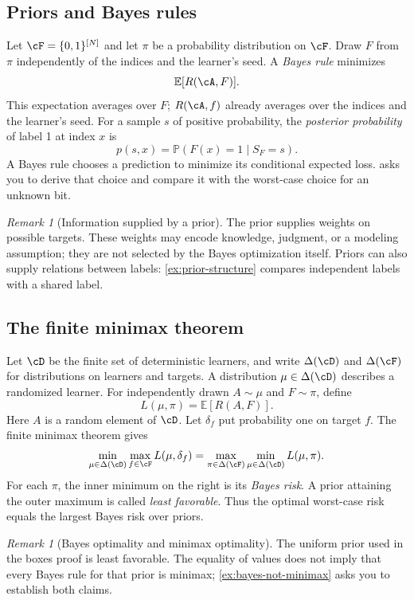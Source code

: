 \documentclass[11pt,twoside]{article}
\renewcommand{\P}{\mathbb P}
\theoremstyle{definition}
\theoremstyle{remark}
\newtheorem{remark}[theorem]{Remark}
\begin{document}
\subsection{Priors and Bayes rules}
Let $\cF=\{0,1\}^{[N]}$ and let $\pi$ be a probability distribution on
$\cF$. Draw $F$ from $\pi$ independently of the indices and the learner's
seed. A \emph{Bayes rule} minimizes
\begin{equation}
\mathbb E[R(\cA,F)].
\label{eq:bayes-risk}
\end{equation}
This expectation averages over $F$; $R(\cA,f)$ already averages over the
indices and the learner's seed. For a sample $s$ of positive probability,
the \emph{posterior probability} of label 1 at index $x$ is
\[
p(s,x)=\P(F(x)=1\mid S_F=s).
\]
A Bayes rule chooses a prediction to minimize its conditional expected loss.
 asks you to derive that choice and compare it
with the worst-case choice for an unknown bit.

\begin{remark}[Information supplied by a prior]
\label{rem:prior-information}
The prior supplies weights on possible targets. These weights may encode
knowledge, judgment, or a modeling assumption; they are not selected by the
Bayes optimization itself. Priors can also supply relations between labels:
\cref{ex:prior-structure} compares independent labels with a shared label.
\end{remark}

\subsection{The finite minimax theorem}
Let $\cD$ be the finite set of deterministic learners, and write
$\Delta(\cD)$ and $\Delta(\cF)$ for distributions on learners and targets.
A distribution $\mu\in\Delta(\cD)$ describes a randomized learner.
For independently drawn $A\sim\mu$ and $F\sim\pi$, define
\begin{equation}
L(\mu,\pi)=\mathbb E[R(A,F)].
\label{eq:game-payoff}
\end{equation}
Here $A$ is a random element of $\cD$. Let $\delta_f$ put probability one
on target $f$. The finite minimax theorem gives
\begin{equation}
\min_{\mu\in\Delta(\cD)}\max_{f\in\cF}L(\mu,\delta_f)
=\max_{\pi\in\Delta(\cF)}\min_{\mu\in\Delta(\cD)}L(\mu,\pi).
\label{eq:finite-minimax}
\end{equation}
For each $\pi$, the inner minimum on the right is its \emph{Bayes risk}. A prior
attaining the outer maximum is called \emph{least favorable}. Thus the
optimal worst-case risk equals the largest Bayes risk over priors.
\begin{remark}[Bayes optimality and minimax optimality]
\label{rem:bayes-minimax}
The uniform prior used in the boxes proof is least favorable. The equality
of values does not imply that every Bayes rule for that prior is minimax;
\cref{ex:bayes-not-minimax} asks you to establish both claims.
\end{remark}
\end{document}
